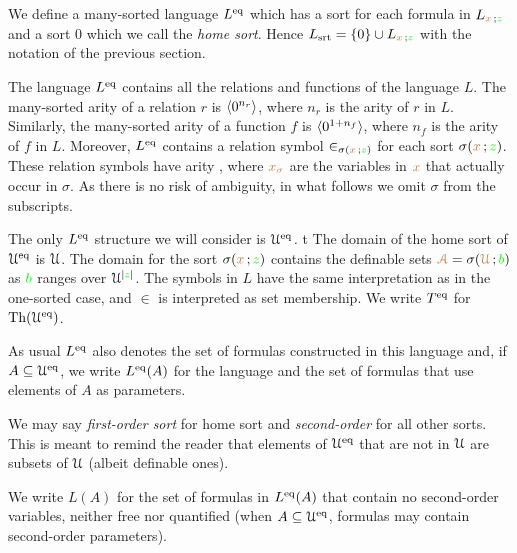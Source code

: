 \documentclass[creche.tex]{subfiles}
\begin{document}
We define a many-sorted language \emph{$L^{{{\rm eq}}}$\/} which has a sort for each formula in $L_{{\color{brown} x}\,;{\color{green} z}}$ and a sort \emph{$0$\/} which we call the \emph{home sort}. 
Hence $L_{\rm srt}=\{0\}\cup L_{{\color{brown} x}\,;{\color{green} z}}$ with the notation of the previous section.

The language $L^{{\rm eq}}$ contains all the relations and functions of the language $L$.
The many-sorted arity of a relation $r$ is $\langle0^{n_r}\rangle$, where $n_r$ is the arity of $r$ in $L$.
Similarly, the many-sorted arity of a function $f$ is $\langle0^{1+n_f}\rangle$, where $n_f$ is the arity of $f$ in $L$.
Moreover, $L^{{\rm eq}}$ contains a relation symbol $\in_{\sigma({\color{brown} x}\,;{\color{green} z})}$ for each sort $\sigma({\color{brown} x}\,;{\color{green} z})$.
These relation symbols have arity , where ${\color{brown} x_\sigma}$ are the variables in ${\color{brown} x}$ that actually occur in $\sigma$. 
As there is no risk of ambiguity, in what follows we omit $\sigma$ from the subscripts.

The only $L^{{\rm eq}}$ structure we will consider is \emph{$\EuScript U^{{{\rm eq}}}$.} t
The domain of the home sort of $\EuScript U^{{{\rm eq}}}$ is $\EuScript U$.
The domain for the sort $\sigma({\color{brown} x}\,;{\color{green} z})$ contains 
the definable sets ${\color{brown}\EuScript A}=\sigma({\color{brown}\EuScript U}\,;{\color{green} b})$ as ${\color{green} b}$ ranges over $\EuScript U^{|{\color{green} z}|}$.
The symbols in $L$ have the same interpretation as in the one-sorted case, and $\in$ is interpreted as set membership.
We write \emph{$T^{{{\rm eq}}}$\/} for $\textrm{Th}(\EuScript U^{{\rm eq}})$.

As usual \emph{$L^{{\rm eq}}$\/} also denotes the set of formulas constructed in this language and, if $A\subseteq\EuScript U^{{\rm eq}}$, we write  \emph{$L^{{\rm eq}}(A)$\/} for the language and the set of formulas that use elements of $A$ as parameters.

We may say \emph{first-order sort\/} for home sort and \emph{second-order\/} for all other sorts. This is meant to remind the reader that elements of $\EuScript U^{{\rm eq}}$ that are not in $\EuScript U$ are subsets of $\EuScript U$ (albeit definable ones).

\noindent\llap{\textcolor{red}{\Large\danger}\kern1.5ex}We write \emph{$L(A)$\/} for the set of formulas in $L^{{\rm eq}}(A)$ that contain no second-order variables, neither free nor quantified (when $A\subseteq\EuScript U^{{\rm eq}}$, formulas may contain second-order parameters).
\end{document}
